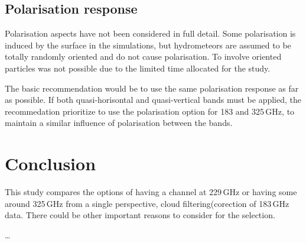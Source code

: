 \documentclass[12pt]{article}
\begin{document}
\subsection{Polarisation response}
%
Polarisation aspects have not been considered in full detail. Some polarisation
is induced by the surface in the simulations, but hydrometeors are assumed to
be totally randomly oriented and do not cause polarisation. To involve oriented
particles was not possible due to the limited time allocated for the study.

The basic recommendation would be to use the same polarisation response as far
as possible. If both quasi-horisontal and quasi-vertical bands must be applied,
the recommedation prioritize to use the polarisation option for 183 and
325\,GHz, to maintain a similar influence of polarisation between the bands.




\section{Conclusion}
%
This study compares the options of having a channel at 229\,GHz or having some
around 325\,GHz from a single perspective, cloud filtering(corection of
183\,GHz data. There could be other important reasons to consider for the
selection.

\dots


{\footnotesize

}
\end{document}
